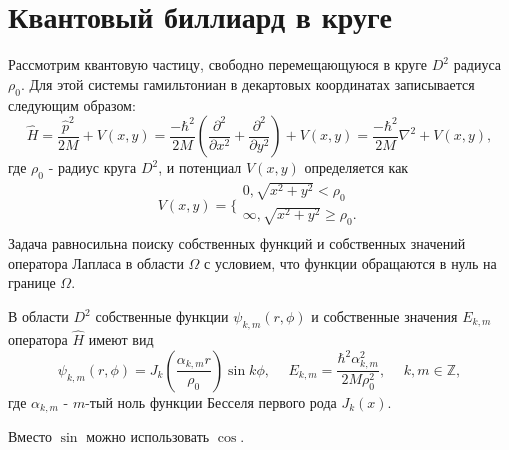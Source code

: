 \section{Квантовый биллиард в круге}\label{sec:ch1/sec2}

Рассмотрим квантовую частицу, свободно перемещающуюся в круге $D^2$ радиуса $\rho_0$. Для этой системы гамильтониан в декартовых координатах записывается следующим образом:
$$\hat{H} = \frac{\hat{p}^2}{2M} + V(x, y) = \frac{-\hbar^2}{2M}\left(\frac{\partial^2 }{\partial x^2} + \frac{\partial^2}{\partial y^2}\right)  + V(x, y) = \frac{-\hbar^2}{2M} \nabla^2  + V(x, y), $$
где $\rho_0$ - радиус круга $D^2$, и потенциал $V(x,y)$ определяется как
\[
    V(x, y) = 
    \Bigg\{
    \begin{array}{cc}
        0, \sqrt{x^2+y^2} < \rho_0 \\
        \infty, \sqrt{x^2+y^2} \geq \rho_0. \\
    \end{array}
\] 
Задача равносильна поиску собственных функций и собственных значений оператора Лапласа в области $\Omega$ с условием, что  функции обращаются в нуль на границе $\Omega$.
\begin{statement}
В области $D^2$ собственные функции $\psi_{k, m}(r, \phi)$ и собственные значения $E_{k,m}$ оператора $\hat{H}$ имеют вид 
$$\psi_{k, m}(r, \phi) = J_k\left(\frac{\alpha_{k, m}r}{\rho_0}\right)\sin{k \phi}, \hspace{15pt} E_{k,m} = \frac{\hbar^2 \alpha_{k, m}^2}{2M\rho_0^2}, \hspace{15pt} k, m \in \mathbb{Z},$$
где $\alpha_{k, m}$ - $m$-тый ноль функции Бесселя первого рода $J_k(x)$.
\label{st:sec1_stat1}
\end{statement}
\begin{remark}
Вместо $\sin$ можно использовать $\cos$.
\end{remark}
